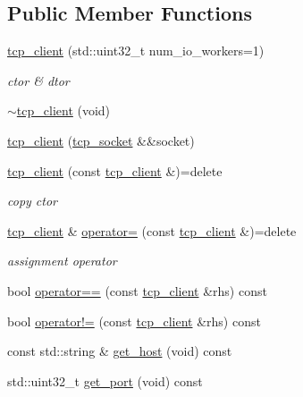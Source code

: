 \subsection*{Public Member Functions}
\begin{DoxyCompactItemize}
\item 
\hyperlink{classtacopie_1_1tcp__client_a0125e1cf017b0ba0370d682d4382d37b}{tcp\+\_\+client} (std\+::uint32\+\_\+t num\+\_\+io\+\_\+workers=1)
\begin{DoxyCompactList}\small\item\em ctor \& dtor \end{DoxyCompactList}\item 
\hyperlink{classtacopie_1_1tcp__client_ae58e13ec11ab68e3b9e1af2f96933a64}{$\sim$tcp\+\_\+client} (void)
\item 
\hyperlink{classtacopie_1_1tcp__client_a773fbcbb5b79324c8d065e363de73282}{tcp\+\_\+client} (\hyperlink{classtacopie_1_1tcp__socket}{tcp\+\_\+socket} \&\&socket)
\item 
\hyperlink{classtacopie_1_1tcp__client_a5e326782c52f63814cc8f42a901ffaf6}{tcp\+\_\+client} (const \hyperlink{classtacopie_1_1tcp__client}{tcp\+\_\+client} \&)=delete
\begin{DoxyCompactList}\small\item\em copy ctor \end{DoxyCompactList}\item 
\hyperlink{classtacopie_1_1tcp__client}{tcp\+\_\+client} \& \hyperlink{classtacopie_1_1tcp__client_aeadcfb8cd727b2917ebcd357311d0a6b}{operator=} (const \hyperlink{classtacopie_1_1tcp__client}{tcp\+\_\+client} \&)=delete
\begin{DoxyCompactList}\small\item\em assignment operator \end{DoxyCompactList}\item 
bool \hyperlink{classtacopie_1_1tcp__client_af7a1796c04efd00542349ecab692e073}{operator==} (const \hyperlink{classtacopie_1_1tcp__client}{tcp\+\_\+client} \&rhs) const
\item 
bool \hyperlink{classtacopie_1_1tcp__client_af352b6b1e939c919aec2761517051eb9}{operator!=} (const \hyperlink{classtacopie_1_1tcp__client}{tcp\+\_\+client} \&rhs) const
\item 
const std\+::string \& \hyperlink{classtacopie_1_1tcp__client_ad38ab710c5eca64de2f887abc455b15d}{get\+\_\+host} (void) const
\item 
std\+::uint32\+\_\+t \hyperlink{classtacopie_1_1tcp__client_a3b42ae2afe6d5ee5f2f16b8bd7846f37}{get\+\_\+port} (void) const

\end{DoxyCompactItemize}
